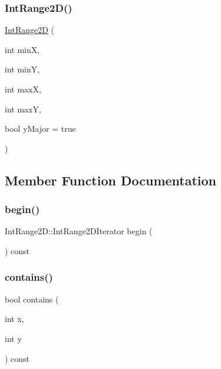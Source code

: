 \mbox{\label{classIntRange2D_a22f22b7ce16863ba7acc111a2b26018b}} 
\subsubsection{\texorpdfstring{Int\+Range2\+D()}{IntRange2D()}\hspace{0.1cm}{\footnotesize\ttfamily [2/2]}}
{\footnotesize\ttfamily \mbox{\hyperlink{classIntRange2D}{Int\+Range2D}} (\begin{DoxyParamCaption}\item[{int}]{minX,  }\item[{int}]{minY,  }\item[{int}]{maxX,  }\item[{int}]{maxY,  }\item[{bool}]{y\+Major = {\ttfamily true} }\end{DoxyParamCaption})}



\subsection{Member Function Documentation}
\mbox{\label{classIntRange2D_a5840f252f949c3f9c0bd1085250a8615}} 
\subsubsection{\texorpdfstring{begin()}{begin()}}
{\footnotesize\ttfamily Int\+Range2\+D\+::\+Int\+Range2\+D\+Iterator begin (\begin{DoxyParamCaption}{ }\end{DoxyParamCaption}) const}

\mbox{\label{classIntRange2D_a39725eb73188fbf2a4b790b1a6849815}} 
\subsubsection{\texorpdfstring{contains()}{contains()}\hspace{0.1cm}{\footnotesize\ttfamily [1/2]}}
{\footnotesize\ttfamily bool contains (\begin{DoxyParamCaption}\item[{int}]{x,  }\item[{int}]{y }\end{DoxyParamCaption}) const}

